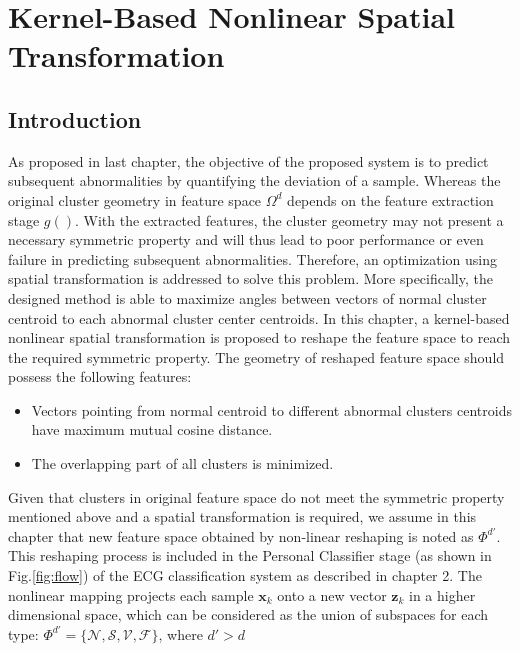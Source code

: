 \chapter{Kernel-Based Nonlinear Spatial Transformation}\label{ch:spheremapping}
\section{Introduction}

As proposed in last chapter, the objective of the proposed system is to predict subsequent abnormalities by quantifying the deviation of a sample. Whereas the original cluster geometry in feature space $\Omega^d$ depends on the feature extraction stage $g()$. With the extracted features, the cluster geometry may not present a necessary symmetric property and will thus lead to poor performance or even failure in predicting subsequent abnormalities. 
Therefore, an optimization using spatial transformation is addressed to solve this problem. More specifically, the designed method is able to maximize angles between vectors of normal cluster centroid to each abnormal cluster center centroids. In this chapter, a kernel-based nonlinear spatial transformation is proposed to reshape the feature space to reach the required symmetric property. The geometry of reshaped feature space should possess the following features:
 \begin{itemize}
     \item Vectors pointing from normal centroid to different abnormal clusters centroids have maximum mutual cosine distance.
     \item The overlapping part of all clusters is minimized.
 \end{itemize}

Given that clusters in original feature space do not meet the symmetric property mentioned above and a spatial transformation is required, we assume in this chapter that new feature space obtained by non-linear reshaping is noted as $\Phi^{d'}$. This reshaping process is included in the Personal Classifier stage (as shown in Fig.\ref{fig:flow}) of the ECG classification system as described in chapter 2. The nonlinear mapping projects each sample $\mathbf{x}_k$  onto a new vector $\mathbf{z}_k$ in a higher dimensional space, which can be considered as the union of subspaces for each type: $\Phi^{d'}=\{\mathcal{N},\mathcal{S},\mathcal{V},\mathcal{F}\}$, where $d'>d$



